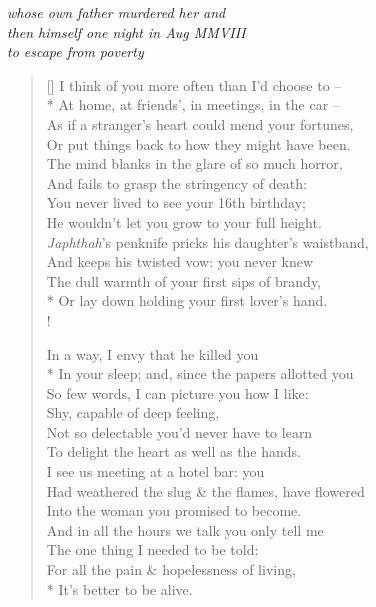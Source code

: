 \begin{center}
    \textit{whose own father murdered her and}\\
    \textit{then himself one night in Aug MMVIII}\\
    \textit{to escape from poverty}
\end{center}

\bigskip

\settowidth{\versewidth}{I think of you more often than I'd choose to --}
\begin{verse}[\versewidth]
    I think of you more often than I'd choose to --\\*
    At home, at friends', in meetings, in the car --\\
    As if a stranger's heart could mend your fortunes,\\
    Or put things back to how they might have been.\\
    The mind blanks in the glare of so much horror,\\
    And fails to grasp the stringency of death:\\
    You never lived to see your 16th birthday;\\
    He wouldn't let you grow to your full height.\\
    \textit{Japhthah}'s penknife pricks his daughter's waistband,\\
    And keeps his twisted vow: you never knew\\
    The dull warmth of your first sips of brandy,\\*
    Or lay down holding your first lover's hand.\\!

    In a way, I envy that he killed you\\*
    In your sleep; and, since the papers allotted you\\
    So few words, I can picture you how I like:\\
    Shy, capable of deep feeling,\\
    Not so delectable you'd never have to learn\\
    To delight the heart as well as the hands.\\
    I see us meeting at a hotel bar: you\\
    Had weathered the slug \& the flames, have flowered\\
    Into the woman you promised to become.\\
    And in all the hours we talk you only tell me\\
    The one thing I needed to be told:\\
    For all the pain \& hopelessness of living,\\*
    It's better to be alive.
\end{verse}
